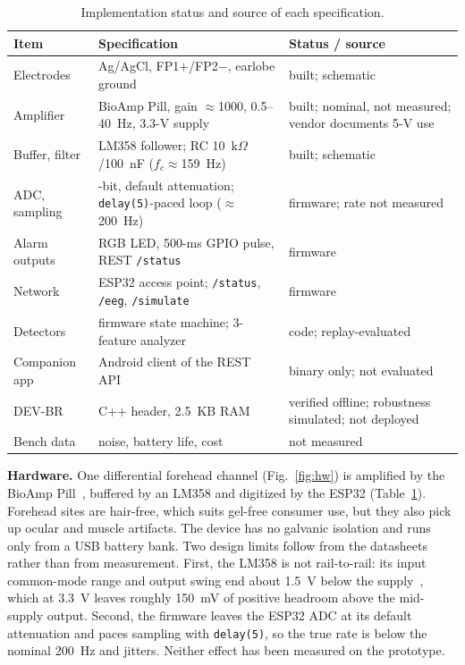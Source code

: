 \documentclass[conference,letterpaper]{IEEEtran}
\begin{document}
\begin{table}[t]
\centering
\caption{Implementation status and source of each specification.}
\label{tab:status}
\footnotesize
\setlength{\tabcolsep}{2.5pt}
\begin{tabular}{>{\raggedright\arraybackslash}p{}>{\raggedright\arraybackslash}p{}>{\raggedright\arraybackslash}p{}}
\toprule
Item & Specification & Status / source \\
\midrule
Electrodes & Ag/AgCl, FP1$+$/FP2$-$, earlobe ground & built; schematic \\
Amplifier & BioAmp Pill, gain $\approx$1000, 0.5--40~Hz, 3.3-V supply & built; nominal, not measured; vendor documents 5-V use~\cite{bioamp} \\
Buffer, filter & LM358 follower; RC 10~k$\Omega$/100~nF ($f_c{\approx}$159~Hz) & built; schematic \\
ADC, sampling & 12-bit, default attenuation; \texttt{delay(5)}-paced loop ($\approx$200~Hz) & firmware; rate not measured \\
Alarm outputs & RGB LED, 500-ms GPIO pulse, REST \texttt{/status} & firmware \\
Network & ESP32 access point; \texttt{/status}, \texttt{/eeg}, \texttt{/simulate} & firmware \\
Detectors & firmware state machine; 3-feature analyzer & code; replay-evaluated \\
Companion app & Android client of the REST API & binary only; not evaluated \\
DEV-BR & C++ header, 2.5~KB RAM & verified offline; robustness simulated; not deployed \\
Bench data & noise, battery life, cost & not measured \\
\bottomrule
\end{tabular}
\end{table}

\textbf{Hardware.} One differential forehead channel (Fig.~\ref{fig:hw}) is amplified by the BioAmp Pill~\cite{bioamp}, buffered by an LM358 and digitized by the ESP32 (Table~\ref{tab:status}). Forehead sites are hair-free, which suits gel-free consumer use, but they also pick up ocular and muscle artifacts. The device has no galvanic isolation and runs only from a USB battery bank. Two design limits follow from the datasheets rather than from measurement. First, the LM358 is not rail-to-rail: its input common-mode range and output swing end about 1.5~V below the supply~\cite{lm358}, which at 3.3~V leaves roughly 150~mV of positive headroom above the mid-supply output. Second, the firmware leaves the ESP32 ADC at its default attenuation and paces sampling with \texttt{delay(5)}, so the true rate is below the nominal 200~Hz and jitters. Neither effect has been measured on the prototype.
\end{document}
